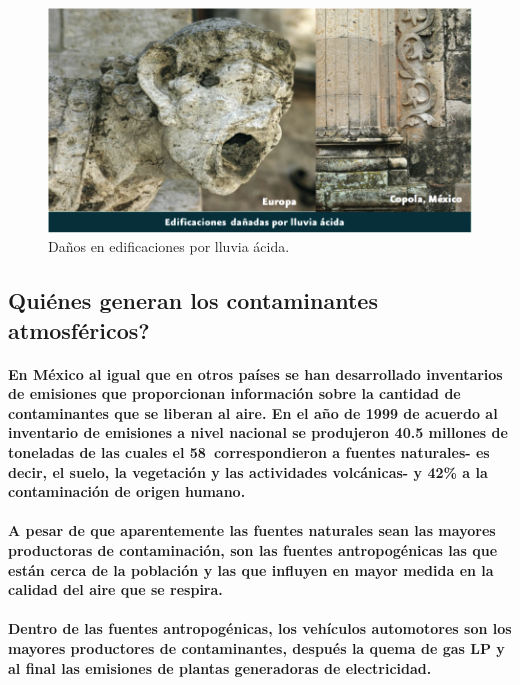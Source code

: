 	\begin{figure}[h!]
	  	\centering
  	      \includegraphics[width=\textwidth]{./images/3.png}
  	    \caption{Daños en edificaciones por lluvia ácida.}
	\end{figure}

    \subsection {Quiénes generan los contaminantes atmosféricos?}
    \paragraph {En México al igual que  en otros países se han desarrollado inventarios de emisiones que proporcionan información sobre la cantidad de contaminantes que se liberan al aire. En el año de 1999 de acuerdo al inventario de emisiones a nivel nacional se produjeron 40.5 millones de toneladas de las cuales el 58\ correspondieron a fuentes naturales- es decir, el suelo, la vegetación y las actividades volcánicas-    y 42\% a la contaminación de origen humano.}

    \paragraph {A pesar de que aparentemente las fuentes naturales sean las mayores productoras de contaminación, son las fuentes antropogénicas las que están cerca de la población y las que influyen en mayor medida en la calidad del aire que se respira.}

    \paragraph {Dentro de las fuentes antropogénicas, los vehículos automotores son los mayores productores de contaminantes, después la quema de gas LP y al final las emisiones de plantas generadoras de  electricidad.}

